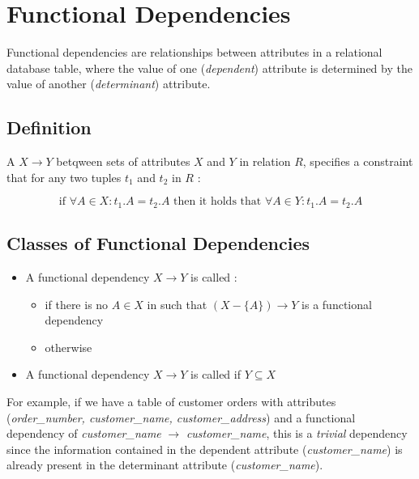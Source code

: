 \section{Functional Dependencies}

Functional dependencies are relationships between attributes in a relational database table, where the value of one (\textit{dependent}) attribute is determined by the value of another (\textit{determinant}) attribute.

\subsection{Definition}

A  $X \rightarrow Y$ betqween sets of attributes $X$ and $Y$ in relation $R$, specifies a constraint that for any two tuples $t_1$ and $t_2$ in $R$ :

\begin{equation*}
\text{if } \forall A \in X : t_1.A = t_2.A \text{ then it holds that } \forall A \in Y : t_1.A = t_2.A
\end{equation*}

\newpage
\subsection{Classes of Functional Dependencies}

\begin{itemize}
    \item A functional dependency $X \rightarrow Y$ is called :
    \begin{itemize}
        \item {} if there is no $A \in X$ in such that $(X - \{A\}) \rightarrow Y$ is a functional dependency
        \item {} otherwise
    \end{itemize}
    \item A functional dependency $X \rightarrow Y$ is called  if $Y \subseteq X$ 
\end{itemize}

For example, if we have a table of customer orders with attributes (\textit{order\_number, customer\_name, customer\_address}) and a functional dependency of \textit{customer\_name} $\rightarrow$ \textit{customer\_name}, this is a \textit{trivial} dependency since the information contained in the dependent attribute (\textit{customer\_name}) is already present in the determinant attribute (\textit{customer\_name}).

